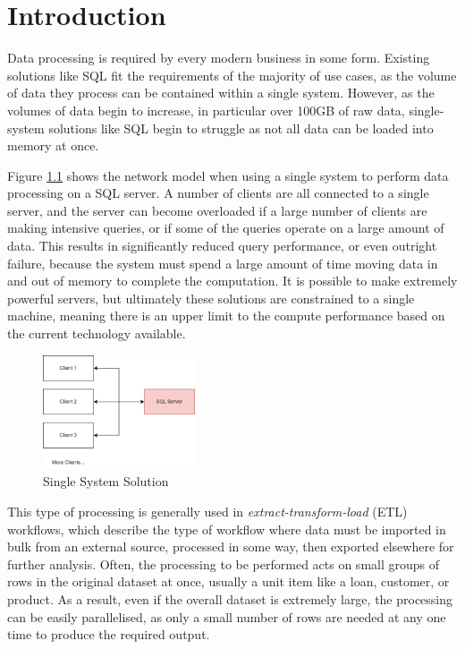 \chapter{Introduction}\label{cha:intro}

Data processing is required by every modern business in some form. Existing solutions like SQL fit the requirements of the majority of use cases, as the volume of data they process can be contained within a single system. However, as the volumes of data begin to increase, in particular over 100GB of raw data, single-system solutions like SQL begin to struggle as not all  data can be loaded into memory at once. 

Figure \ref{fig:single-system-solution} shows the network model when using a single system to perform data processing on a SQL server. A number of clients are all connected to a single server, and the server can become overloaded if a large number of clients are making intensive queries, or if some of the queries operate on a large amount of data. This results in significantly reduced query performance, or even outright failure, because the system must spend a large amount of time moving data in and out of memory to complete the computation. It is possible to make extremely powerful servers, but ultimately these solutions are constrained to a single machine, meaning there is an upper limit to the compute performance based on the current technology available.

\begin{figure}[h]
	\centering
	\includegraphics[width=0.4\textwidth]{chapters/diagrams/design/single-system-solution}
	\caption{Single System Solution}
	\label{fig:single-system-solution}
\end{figure}

This type of processing is generally used in \textit{extract-transform-load} (ETL) workflows, which describe the type of workflow where data must be imported in bulk from an external source, processed in some way, then exported elsewhere for further analysis. Often, the processing to be performed acts on small groups of rows in the original dataset at once, usually a unit item like a loan, customer, or product. As a result, even if the overall dataset is extremely large, the processing can be easily parallelised, as only a small number of rows are needed at any one time to produce the required output.

